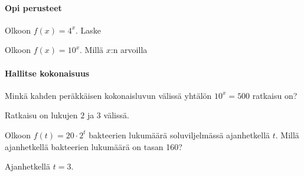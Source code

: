 \begin{tehtavasivu}

\paragraph*{Opi perusteet}

\begin{tehtava}
Olkoon $f(x) = 4^x$. Laske
\begin{alakohdat}
\end{alakohdat}
\begin{vastaus}
\begin{alakohdat}
\end{alakohdat}
\end{vastaus}
\end{tehtava}

\begin{tehtava}
Olkoon $f(x) = 10^x$. Millä $x$:n arvoilla
\begin{alakohdat}
\end{alakohdat}
\begin{vastaus}
\begin{alakohdat}
\end{alakohdat}
\end{vastaus}
\end{tehtava}

\paragraph*{Hallitse kokonaisuus}
\begin{tehtava}
Minkä kahden peräkkäisen kokonaisluvun välissä yhtälön
$10^x = 500$ ratkaisu on?
\begin{vastaus}
Ratkaisu on lukujen $2$ ja $3$ välissä.
\end{vastaus}
\end{tehtava}


\begin{tehtava}
Olkoon $f(t) = 20 \cdot 2^t$ bakteerien lukumäärä soluviljelmässä
ajanhetkellä $t$. Millä ajanhetkellä bakteerien lukumäärä on tasan 160?
\begin{vastaus}
Ajanhetkellä $t = 3$.
\end{vastaus}
\end{tehtava}


\end{tehtavasivu}

